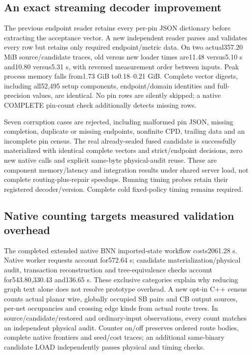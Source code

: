 \documentclass[conference,10pt]{IEEEtran}
\begin{document}
\subsection{An exact streaming decoder improvement}
The previous endpoint reader retains every per-pin JSON dictionary before extracting the acceptance vector. A new independent reader parses and validates every row but retains only required endpoint/metric data. On two actual357.20 MiB source/candidate traces, old versus new loader times are11.48 versus5.10 s and10.80 versus5.31 s, with reversed measurement order between inputs. Peak process memory falls from1.73 GiB to0.18--0.21 GiB. Complete vector digests, including all52,495 setup components, endpoint/domain identities and full-precision values, are identical. No pin rows are silently skipped; a native COMPLETE pin-count check additionally detects missing rows.

Seven corruption cases are rejected, including malformed pin JSON, missing completion, duplicate or missing endpoints, nonfinite CPD, trailing data and an incomplete pin census. The real already-sealed fused candidate is successfully materialized with identical complete vectors and strict/endpoint decisions, zero new native calls and explicit same-byte physical-audit reuse. These are component memory/latency and integration results under shared server load, not complete routing-plus-repair speedups. Running timing probes retain their registered decoder/version. Complete cold fixed-policy timing remains required.

\subsection{Native counting targets measured validation overhead}
The completed extended native BNN imported-state workflow costs2061.28 s. Native worker requests account for572.64 s; candidate materialization/physical audit, transaction reconstruction and tree-equivalence checks account for543.80,330.43 and136.65 s. These exclusive categories explain why reducing graph text alone does not resolve prototype overhead. A new opt-in C++ census counts actual planar wire, globally occupied SB pairs and CB output sources, per-net occupancies and crossing edge kinds from actual route trees. In source/candidate/restored and ordinary-input observations, every count matches an independent physical audit. Counter on/off preserves ordered route bodies, complete native frontiers and seed/cost traces; an additional same-binary candidate LOAD independently passes physical and timing checks.
\end{document}
